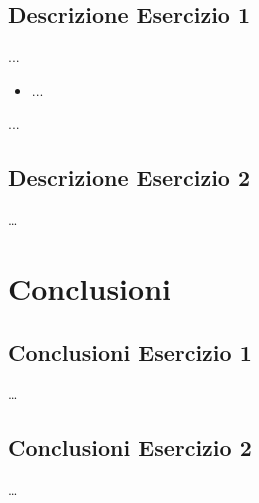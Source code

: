 \documentclass[a4paper]{article}
\begin{document}
\subsection{Descrizione Esercizio 1}
...
\begin{itemize}
\item ...
\end{itemize}
...

\subsection{Descrizione Esercizio 2}
\dots

\section{Conclusioni}
\subsection{Conclusioni Esercizio 1}
\dots
\subsection{Conclusioni Esercizio 2}
\dots
\end{document}
